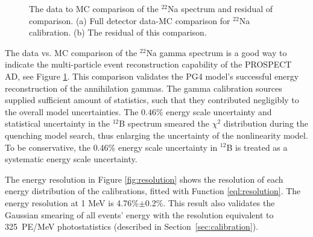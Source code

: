 \begin{figure}[h!]
\centering
{} \quad
{} \quad
\caption[The data to best fit MC comparison of the $^{22}$Na gamma events]{The data to MC comparison of the $^{22}$Na spectrum and residual of comparison. (a) Full detector data-MC comparison for $^{22}$Na calibration. (b) The residual of this comparison.}
\label{fig:Na22final}
\end{figure}

The data vs. MC comparison of the $^{22}$Na gamma spectrum is a good way to indicate the multi-particle event reconstruction capability of the PROSPECT AD, see Figure \ref{fig:Na22final}.
This comparison validates the PG4 model's successful energy reconstruction of the annihilation gammas.
The gamma calibration sources supplied sufficient amount of statistics, such that they contributed negligibly to the overall model uncertainties. 
The $0.46\%$ energy scale uncertainty and statistical uncertainty in the $^{12}$B spectrum smeared the $\chi^2$ distribution during the quenching model search, thus enlarging the uncertainty of the nonlinearity model. 
To be conservative, the 0.46\% energy scale uncertainty in $^{12}$B is treated as a systematic energy scale uncertainty.

The energy resolution in Figure \ref{fig:resolution} shows the resolution of each energy distribution of the calibrations, fitted with Function \ref{eql:resolution}.
The energy resolution at 1 MeV is 4.76\%$\pm$0.2\%.
This result also validates the Gaussian smearing of all events' energy with the resolution equivalent to 325~PE/MeV photostatistics (described in Section~\ref{sec:calibration}).

